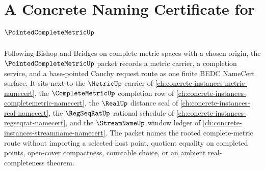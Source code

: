 \chapter{A Concrete Naming Certificate for $\PointedCompleteMetricUp$}
\label{ch:concrete-instances-pointed-complete-metric-namecert}

Following Bishop and Bridges on complete metric spaces with a chosen origin, the
$\PointedCompleteMetricUp$ packet records a metric carrier, a completion
service, and a base-pointed Cauchy request route as one finite BEDC
NameCert surface. It sits next to the $\MetricUp$ carrier of
\autoref{ch:concrete-instances-metric-namecert}, the
$\CompleteMetricUp$ completion row of
\autoref{ch:concrete-instances-completemetric-namecert}, the $\RealUp$
distance seal of \autoref{ch:concrete-instances-real-namecert}, the
$\RegSeqRatUp$ rational schedule of
\autoref{ch:concrete-instances-regseqrat-namecert}, and the $\StreamNameUp$
window ledger of \autoref{ch:concrete-instances-streamname-namecert}. The
packet names the rooted complete-metric route without importing a selected host
point, quotient equality on completed points, open-cover compactness, countable
choice, or an ambient real-completeness theorem.

